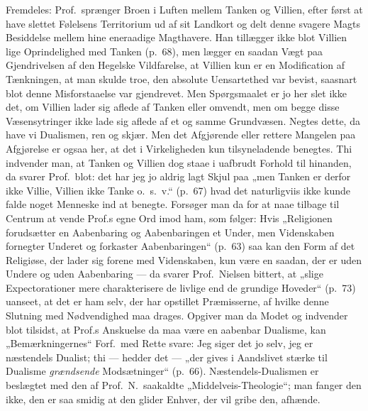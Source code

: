 Fremdeles: Prof.\ sprænger Broen i Luften mellem Tanken og Villien, efter
først at have slettet Følelsens Territorium ud af sit Landkort og delt denne
svagere Magts Besiddelse mellem hine eneraadige Magthavere. Han tillægger ikke
blot Villien lige Oprindelighed med Tanken (p.\ 68), men lægger en saadan Vægt
paa Gjendrivelsen af den Hegelske Vildfarelse, at Villien kun er en
Modification af Tænkningen, at man skulde troe, den absolute Uensartethed var
bevist, saasnart blot denne Misforstaaelse var gjendrevet. Men Spørgsmaalet er
jo her slet ikke det, om Villien lader sig aflede af Tanken eller omvendt, men
om begge disse Væsensytringer ikke lade sig aflede af et og samme Grundvæsen.
Negtes dette, da have vi Dualismen, ren og skjær. Men det Afgjørende eller
rettere Mangelen paa Afgjørelse er ogsaa her, at det i Virkeligheden kun
tilsyneladende benegtes. Thi indvender man, at Tanken og Villien dog staae i
uafbrudt Forhold til hinanden, da svarer Prof.\ blot: det har jeg jo aldrig
lagt Skjul paa „men Tanken er derfor ikke Villie, Villien ikke Tanke o.\ s.\
v.“ (p.\ 67) hvad det naturligviis ikke kunde falde noget
\opage{60}Menneske ind at benegte. Forsøger man da for at naae tilbage til
Centrum at vende Prof.s egne Ord imod ham, som følger: Hvis „Religionen
forudsætter en Aabenbaring og Aabenbaringen et Under, men Videnskaben fornegter
Underet og forkaster Aabenbaringen“ (p.\ 63) saa kan den Form af det Religiøse,
der lader sig forene med Videnskaben, kun være en saadan, der er uden Undere og
uden Aabenbaring --- da svarer Prof.\ Nielsen bittert, at „slige
Expectorationer mere charakterisere de livlige end de grundige Hoveder“ (p.\
73) uanseet, at det er ham selv, der har opstillet Præmisserne, af hvilke denne
Slutning med Nødvendighed maa drages. Opgiver man da Modet og indvender blot
tilsidst, at Prof.s Anskuelse da maa være en aabenbar Dualisme, kan
„Bemærkningernes“ Forf.\ med Rette svare: Jeg siger det jo selv, jeg er
næstendels Dualist; thi --- hedder det --- „der gives i Aandslivet stærke til
Dualisme \emph{grændsende} Modsætninger“ (p.\ 66). Næstendels-Dualismen er
beslægtet med den af Prof.\ N.\ saakaldte „Middelveis-Theologie“; man fanger
den ikke, den er saa smidig at den glider Enhver, der vil gribe den, afhænde.

